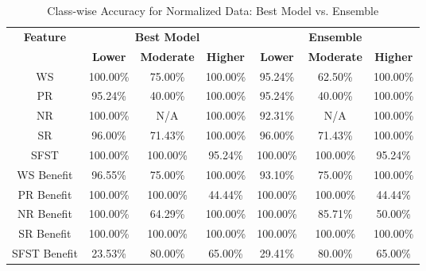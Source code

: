 \begin{table}[H]
\centering
\begin{tabular}{|c|c|c|c|c|c|c|}
\hline
\multirow{2}{*}{\textbf{Feature}} & \multicolumn{3}{c|}{\textbf{Best Model}} & \multicolumn{3}{c|}{\textbf{Ensemble}} \\
\cline{2-7}
 & \textbf{Lower} & \textbf{Moderate} & \textbf{Higher} & \textbf{Lower} & \textbf{Moderate} & \textbf{Higher} \\
\hline
WS & 100.00\% & 75.00\% & 100.00\% & 95.24\% & 62.50\% & 100.00\% \\
\hline
PR & 95.24\% & 40.00\% & 100.00\% & 95.24\% & 40.00\% & 100.00\% \\
\hline
NR & 100.00\% & N/A & 100.00\% & 92.31\% & N/A & 100.00\% \\
\hline
SR & 96.00\% & 71.43\% & 100.00\% & 96.00\% & 71.43\% & 100.00\% \\
\hline
SFST & 100.00\% & 100.00\% & 95.24\% & 100.00\% & 100.00\% & 95.24\% \\
\hline
WS Benefit & 96.55\% & 75.00\% & 100.00\% & 93.10\% & 75.00\% & 100.00\% \\
\hline
PR Benefit & 100.00\% & 100.00\% & 44.44\% & 100.00\% & 100.00\% & 44.44\% \\
\hline
NR Benefit & 100.00\% & 64.29\% & 100.00\% & 100.00\% & 85.71\% & 50.00\% \\
\hline
SR Benefit & 100.00\% & 100.00\% & 100.00\% & 100.00\% & 100.00\% & 100.00\% \\
\hline
SFST Benefit & 23.53\% & 80.00\% & 65.00\% & 29.41\% & 80.00\% & 65.00\% \\
\hline
\end{tabular}
\caption{Class-wise Accuracy for Normalized Data: Best Model vs. Ensemble}
\label{reg_spec_tab:norm_accuracy}
\end{table}
